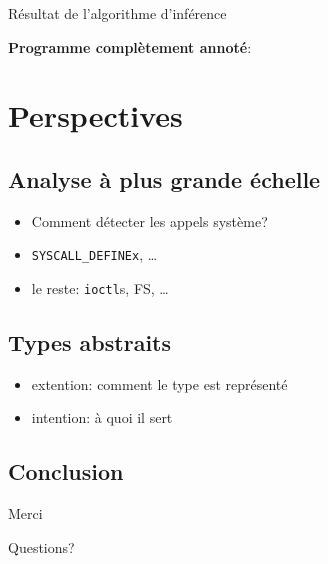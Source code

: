 \documentclass{beamer}
\def\codeout#1{
    \begin{center}
    \fboxsep=2mm
    \colorbox{codeoutcol}{\BUseVerbatim{#1}}
    \end{center}
}
\begin{document}
\begin{frame}[fragile]{Résultat de l'algorithme d'inférence}

\textbf{Programme complètement annoté}:


\codeout{drmok}
\end{frame}

\section{Perspectives}

\subsection{Analyse à plus grande échelle}

\begin{frame}
    \begin{itemize}
        \item Comment détecter les appels système?
        \item \texttt{SYSCALL\_DEFINEx}, …
        \item le reste: \texttt{ioctl}s, FS, …
    \end{itemize}
\end{frame}

\subsection{Types abstraits}

\begin{frame}
    \begin{itemize}
        \item extention: comment le type est représenté
        \item intention: à quoi il sert
    \end{itemize}
\end{frame}

\subsection{Conclusion}

\begin{frame}
    Merci

    Questions?
\end{frame}
\end{document}
